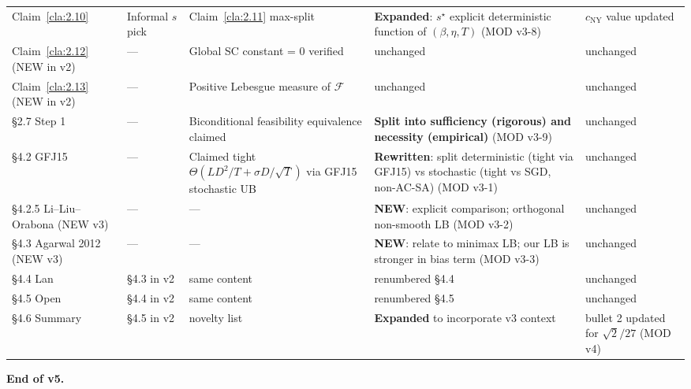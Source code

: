 \documentclass[11pt,a4paper]{article}
\theoremstyle{plain}
\theoremstyle{definition}
\theoremstyle{remark}
\newcommand{\F}{\mathcal{F}}
\begin{document}
\begin{longtable}{@{}p{2.0cm}p{2.9cm}p{2.9cm}p{2.9cm}p{2.9cm}@{}}
Claim~\ref{cla:2.10} & Informal $s$ pick & Claim~\ref{cla:2.11} max-split & \textbf{Expanded}: $s^\star$ explicit deterministic function of $(\beta,\eta,T)$ (MOD v3-8) & $c_\mathrm{NY}$ value updated \\
Claim~\ref{cla:2.12} (NEW in v2) & --- & Global SC constant = 0 verified & unchanged & unchanged \\
Claim~\ref{cla:2.13} (NEW in v2) & --- & Positive Lebesgue measure of $\F$ & unchanged & unchanged \\
\S2.7 Step 1 & --- & Biconditional feasibility equivalence claimed & \textbf{Split into sufficiency (rigorous) and necessity (empirical)} (MOD v3-9) & unchanged \\
\S4.2 GFJ15 & --- & Claimed tight $\Theta(LD^2/T + \sigma D/\sqrt T)$ via GFJ15 stochastic UB & \textbf{Rewritten}: split deterministic (tight via GFJ15) vs stochastic (tight vs SGD, non-AC-SA) (MOD v3-1) & unchanged \\
\S4.2.5 Li--Liu--Orabona (NEW v3) & --- & --- & \textbf{NEW}: explicit comparison; orthogonal non-smooth LB (MOD v3-2) & unchanged \\
\S4.3 Agarwal 2012 (NEW v3) & --- & --- & \textbf{NEW}: relate to minimax LB; our LB is stronger in bias term (MOD v3-3) & unchanged \\
\S4.4 Lan & \S4.3 in v2 & same content & renumbered \S4.4 & unchanged \\
\S4.5 Open & \S4.4 in v2 & same content & renumbered \S4.5 & unchanged \\
\S4.6 Summary & \S4.5 in v2 & novelty list & \textbf{Expanded} to incorporate v3 context & bullet 2 updated for $\sqrt 2/27$ (MOD v4) \\
\end{longtable}
\normalsize

\textbf{End of v5.}
\end{document}
